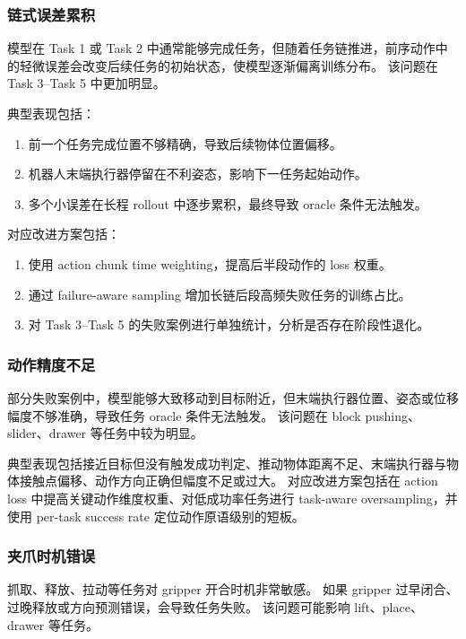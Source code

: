 \documentclass[10pt,a4paper,fontset=none]{ctexart}
\begin{document}
\subsubsection{链式误差累积}

模型在 Task 1 或 Task 2 中通常能够完成任务，但随着任务链推进，前序动作中的轻微误差会改变后续任务的初始状态，使模型逐渐偏离训练分布。
该问题在 Task 3--Task 5 中更加明显。

典型表现包括：

\begin{enumerate}
  \item 前一个任务完成位置不够精确，导致后续物体位置偏移。
  \item 机器人末端执行器停留在不利姿态，影响下一任务起始动作。
  \item 多个小误差在长程 rollout 中逐步累积，最终导致 oracle 条件无法触发。
\end{enumerate}

对应改进方案包括：

\begin{enumerate}
  \item 使用 action chunk time weighting，提高后半段动作的 loss 权重。
  \item 通过 failure-aware sampling 增加长链后段高频失败任务的训练占比。
  \item 对 Task 3--Task 5 的失败案例进行单独统计，分析是否存在阶段性退化。
\end{enumerate}

\subsubsection{动作精度不足}

部分失败案例中，模型能够大致移动到目标附近，但末端执行器位置、姿态或位移幅度不够准确，导致任务 oracle 条件无法触发。
该问题在 block pushing、slider、drawer 等任务中较为明显。

典型表现包括接近目标但没有触发成功判定、推动物体距离不足、末端执行器与物体接触点偏移、动作方向正确但幅度不足或过大。
对应改进方案包括在 action loss 中提高关键动作维度权重、对低成功率任务进行 task-aware oversampling，并使用 per-task success rate 定位动作原语级别的短板。

\subsubsection{夹爪时机错误}

抓取、释放、拉动等任务对 gripper 开合时机非常敏感。
如果 gripper 过早闭合、过晚释放或方向预测错误，会导致任务失败。
该问题可能影响 lift、place、drawer 等任务。
\end{document}
